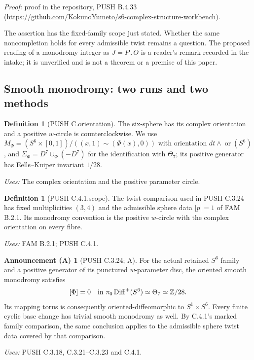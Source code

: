 \documentclass[11pt,a4paper]{article}
\theoremstyle{plain}
\theoremstyle{definition}
\newtheorem{announcement}[theorem]{Announcement (A)}
\newtheorem{definition}[theorem]{Definition}
\newcommand{\Z}{\mathbb Z}
\begin{document}
\noindent\emph{Proof:} proof in the repository, PUSH B.4.33 (\url{https://github.com/KokunoYumeto/s6-complex-structure-workbench}).

The assertion has the fixed-family scope just stated. Whether the same
noncompletion holds for every admissible twist remains a question.
The proposed reading of a monodromy integer as $J=P\mathbin{.}O$ is a
reader's remark recorded in the intake; it is unverified and is not a
theorem or a premise of this paper.
\subsection{Smooth monodromy: two runs and two methods}
\begin{definition}[PUSH C.orientation]\label{push:C.orientation}
The six-sphere has its complex orientation and a positive $w$-circle
is counterclockwise. We use
$M_\Phi=(S^6\times[0,1])/((x,1)\sim(\Phi(x),0))$ with orientation
$dt\wedge\operatorname{or}(S^6)$, and
$\Sigma_\Phi=D^7\cup_\Phi(-D^7)$ for the identification with
$\Theta_7$; its positive generator has Eells--Kuiper invariant $1/28$.
\end{definition}
\noindent\emph{Uses:} The complex orientation and the positive parameter circle.\par

\begin{definition}[PUSH C.4.1.scope]\label{push:C.4.1.scope}
The twist comparison used in PUSH C.3.24 has fixed multiplicities $(3,4)$ and the admissible sphere data $|p|=1$ of FAM B.2.1. Its monodromy convention is the positive $w$-circle with the complex orientation on every fibre.
\end{definition}
\noindent\emph{Uses:} FAM B.2.1; PUSH C.4.1.\par

\begin{announcement}[PUSH C.3.24; A]\label{push:C.3.24}
For the actual retained $S^6$ family and a positive generator
of its punctured $w$-parameter disc, the oriented smooth
monodromy satisfies
\[
 [\Phi]=0\quad\hbox{in }\pi_0\operatorname{Diff}^+(S^6)
                       \simeq\Theta_7\simeq\Z/28.
\]
Its mapping torus is consequently oriented-diffeomorphic to
$S^1\times S^6$. Every finite cyclic base change has trivial
smooth monodromy as well. By C.4.1's marked family comparison,
the same conclusion applies to the admissible sphere twist
data covered by that comparison.
\end{announcement}
\noindent\emph{Uses:} PUSH C.3.18, C.3.21--C.3.23 and C.4.1.\par
\end{document}
